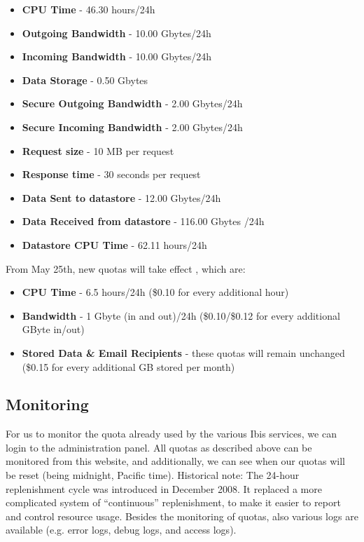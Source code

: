 \begin{itemize}
\item \textbf{CPU Time} - 46.30 hours/24h
\item \textbf{Outgoing Bandwidth} - 10.00 Gbytes/24h
\item \textbf{Incoming Bandwidth} - 10.00 Gbytes/24h
\item \textbf{Data Storage} - 0.50 Gbytes
\item \textbf{Secure Outgoing Bandwidth} - 2.00 Gbytes/24h
\item \textbf{Secure Incoming Bandwidth} - 2.00 Gbytes/24h
\item \textbf{Request size} - 10 MB per request
\item \textbf{Response time} - 30 seconds per request
\item \textbf{Data Sent to datastore} - 12.00 Gbytes/24h
\item \textbf{Data Received from datastore} - 116.00 Gbytes /24h
\item \textbf{Datastore CPU Time} - 62.11 hours/24h
\end{itemize}
From May 25th, new quotas will take effect \cite{app-engine-quotas}, which are:
\begin{itemize} 
\item \textbf{CPU Time} - 6.5 hours/24h (\$0.10 for every additional hour)
\item \textbf{Bandwidth} - 1 Gbyte (in and out)/24h (\$0.10/\$0.12 for every additional
GByte in/out)
\item \textbf{Stored Data \& Email Recipients} - these quotas will remain
unchanged (\$0.15 for every additional GB stored per month)
\end{itemize}

\subsection{Monitoring}
For us to monitor the quota already used by the various Ibis services, we can
login to the administration panel. All quotas as described above can be
monitored from this website, and additionally, we can see when our quotas will be
reset (being midnight, Pacific time). Historical note: The 24-hour replenishment
cycle was introduced in December 2008. It replaced a more complicated system of
``continuous'' replenishment, to make it easier to report and control resource
usage. Besides the monitoring of quotas, also various logs are available (e.g.
error logs, debug logs, and access logs).
